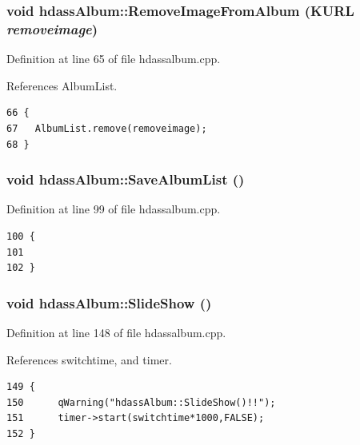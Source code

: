 \subsubsection{\setlength{\rightskip}{0pt plus 5cm}void hdass\-Album::Remove\-Image\-From\-Album (KURL {\em removeimage})\hspace{0.3cm}{\tt  [slot]}}\label{classhdassAlbum_ImageDetiali2}




Definition at line 65 of file hdassalbum.cpp.

References Album\-List.



\footnotesize\begin{verbatim}66 {
67   AlbumList.remove(removeimage);
68 }
\end{verbatim}\normalsize 
{}
\subsubsection{\setlength{\rightskip}{0pt plus 5cm}void hdass\-Album::Save\-Album\-List ()\hspace{0.3cm}{\tt  [private]}}\label{classhdassAlbum_hdassAlbumd1}




Definition at line 99 of file hdassalbum.cpp.



\footnotesize\begin{verbatim}100 {
101 
102 }
\end{verbatim}\normalsize 
{}
\subsubsection{\setlength{\rightskip}{0pt plus 5cm}void hdass\-Album::Slide\-Show ()}\label{classhdassAlbum_ImageDetiala3}




Definition at line 148 of file hdassalbum.cpp.

References switchtime, and timer.



\footnotesize\begin{verbatim}149 {
150      qWarning("hdassAlbum::SlideShow()!!");
151      timer->start(switchtime*1000,FALSE);
152 }
\end{verbatim}\normalsize 
{}
